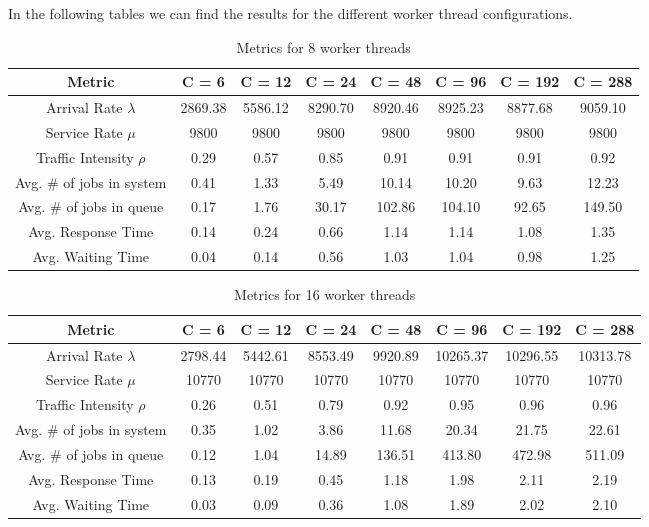 \documentclass[11pt,a4paper]{article}
\begin{document}
%
In the following tables we can find the results for the different worker thread configurations.
%
\begin{table}[H]
\centering
\scriptsize{
\begin{tabular}{c|ccccccc}
\hline Metric & C = 6 & C = 12 & C = 24 & C = 48 & C = 96 & C = 192 & C = 288\\
\hline
Arrival Rate $\lambda$ & 2869.38 & 5586.12 & 8290.70 & 8920.46 & 8925.23 & 8877.68 & 9059.10\\
Service Rate $\mu$ & 9800 & 9800 & 9800 & 9800 & 9800 & 9800 & 9800\\
Traffic Intensity $\rho$ & 0.29 & 0.57 & 0.85 & 0.91 & 0.91 & 0.91 & 0.92\\
Avg. \# of jobs in system & 0.41 & 1.33 & 5.49 & 10.14 & 10.20 & 9.63 & 12.23\\
Avg. \# of jobs in queue & 0.17 & 1.76 & 30.17 & 102.86 & 104.10 & 92.65 & 149.50\\
Avg. Response Time & 0.14 & 0.24 & 0.66 & 1.14 & 1.14 & 1.08 & 1.35\\
Avg. Waiting Time & 0.04 & 0.14 & 0.56 & 1.03 & 1.04 & 0.98 & 1.25\\
\end{tabular}
}
\caption{Metrics for 8 worker threads}
\end{table}
%
\begin{table}[H]
\centering
\scriptsize{
\begin{tabular}{c|ccccccc}
\hline Metric & C = 6 & C = 12 & C = 24 & C = 48 & C = 96 & C = 192 & C = 288\\
\hline
Arrival Rate $\lambda$ & 2798.44 & 5442.61 & 8553.49 & 9920.89 & 10265.37 & 10296.55 & 10313.78\\
Service Rate $\mu$ & 10770 & 10770 & 10770 & 10770 & 10770 & 10770 & 10770\\
Traffic Intensity $\rho$ & 0.26 & 0.51 & 0.79 & 0.92 & 0.95 & 0.96 & 0.96\\
Avg. \# of jobs in system & 0.35 & 1.02 & 3.86 & 11.68 & 20.34 & 21.75 & 22.61\\
Avg. \# of jobs in queue & 0.12 & 1.04 & 14.89 & 136.51 & 413.80 & 472.98 & 511.09\\
Avg. Response Time & 0.13 & 0.19 & 0.45 & 1.18 & 1.98 & 2.11 & 2.19\\
Avg. Waiting Time & 0.03 & 0.09 & 0.36 & 1.08 & 1.89 & 2.02 & 2.10\\
\end{tabular}
}
\caption{Metrics for 16 worker threads}
\end{table}
\end{document}
